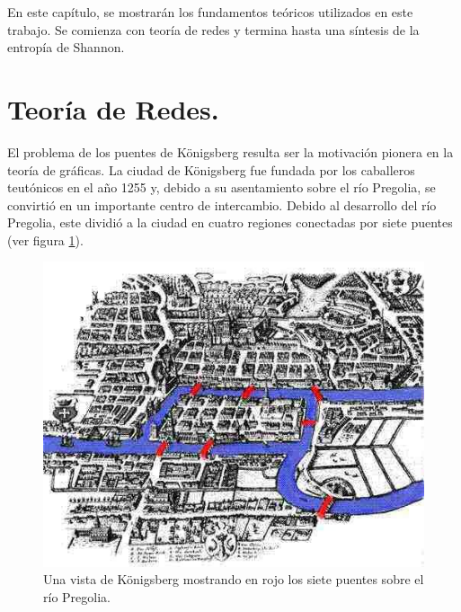 \documentclass[../main.tex]{subfiles}
\begin{document}
\onehalfspacing



En este capítulo, se mostrarán los fundamentos teóricos utilizados en este trabajo. Se comienza con teoría de redes y termina hasta una síntesis de la entropía de Shannon.

\section{Teoría de Redes.}



El problema de los puentes de Königsberg resulta ser la motivación pionera en la teoría de gráficas. La  ciudad de Königsberg fue fundada por los caballeros teutónicos en el año 1255 y, debido a su asentamiento sobre el río Pregolia, se convirtió en un importante centro de intercambio. Debido al desarrollo del río Pregolia, este dividió a la ciudad en cuatro regiones conectadas por siete puentes (ver figura \ref{fig:marcoteorico_konigsberg}).



\begin{figure}[h!]
    \centering
    \includegraphics[scale = 0.5]{images/marcoteorico_konigsberg.jpg}
    \caption{Una vista de Königsberg mostrando en rojo los siete puentes sobre el río Pregolia.  }
    \label{fig:marcoteorico_konigsberg}
\end{figure}
\end{document}
